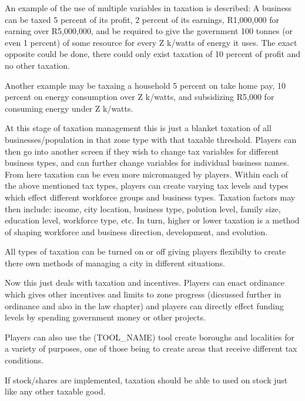 An example of the use of multiple variables in taxation is described:
A business can be taxed 5 percent of its profit, 2 percent of its earnings, R1,000,000 for earning over R5,000,000, and be required to give the government 100 tonnes (or even 1 percent) of some resource for every Z k/watts of energy it uses. The exact opposite could be done, there could only exist taxation of 10 percent of profit and no other taxation. 

Another example may be taxaing a household 5 percent on take home pay, 10 percent on energy consumption over Z k/watts, and subsidizing R5,000 for consuming energy under Z k/watts.


At this stage of taxation management this is just a blanket taxation of all businesses/population in that zone type with that taxable threshold. Players can then go into another screen if they wish to change tax variables for different business types, and can further change variables for individual business names. From here taxation can be even more micromanged by players. Within each of the above mentioned tax types, players can create varying tax levels and types which effect different workforce groups and business types. Taxation factors may then include: income, city location, business type, polution level, family size, education level, workforce type, etc. In turn, higher or lower taxation is a method of shaping workforce and business direction, development, and evolution. 

All types of taxation can be turned on or off giving players flexibilty to create there own methods of managing a city in different situations.

Now this just deals with taxation and incentives. Players can enact ordinance which gives other incentives and limits to zone progress (dicsussed further in ordinance and also in the law chapter) and players can directly effect funding levels by spending government money or other projects. 


Players can also use the (TOOL_NAME) tool create boroughs and localities for a variety of purposes, one of those being to create areas that receive different tax conditions.
 
If stock/shares are implemented, taxation should be able to used on stock just like any other taxable good.



